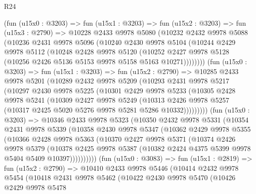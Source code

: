 \begin{lexlean}{R24}
\begin{coremodule}
    (fun (u15x0 : @3203) =>
    fun (u15x1 : @3203) =>
    fun (u15x2 : @3203) =>
    fun (u15x3 : @2790) =>
    @10228
      @2433
      @9978
      @5080
      (@10232
        @2432
        @9978
        @5088
        (@10236
          @2431
          @9978
          @5096
          (@10240
            @2430
            @9978
            @5104
            (@10244
              @2429
              @9978
              @5112
              (@10248
                @2428
                @9978
                @5120
                (@10252 @2427 @9978 @5128 (@10256 @2426 @5136 @5153 @9978 @5158 @5163 @10271))))))))
    (fun (u15x0 : @3203) =>
    fun (u15x1 : @3203) =>
    fun (u15x2 : @2790) =>
    @10285
      @2433
      @9978
      @5201
      (@10289
        @2432
        @9978
        @5209
        (@10293
          @2431
          @9978
          @5217
          (@10297
            @2430
            @9978
            @5225
            (@10301
              @2429
              @9978
              @5233
              (@10305
                @2428
                @9978
                @5241
                (@10309
                  @2427
                  @9978
                  @5249
                  (@10313
                    @2426
                    @9978
                    @5257
                    (@10317 @2425 @5020 @5276 @9978 @5281 @5286 @10332)))))))))
    (fun (u15x0 : @3203) =>
    @10346
      @2433
      @9978
      @5323
      (@10350
        @2432
        @9978
        @5331
        (@10354
          @2431
          @9978
          @5339
          (@10358
            @2430
            @9978
            @5347
            (@10362
              @2429
              @9978
              @5355
              (@10366
                @2428
                @9978
                @5363
                (@10370
                  @2427
                  @9978
                  @5371
                  (@10374
                    @2426
                    @9978
                    @5379
                    (@10378
                      @2425
                      @9978
                      @5387
                      (@10382 @2424 @4375 @5399 @9978 @5404 @5409 @10397))))))))))
    (fun (u15x0 : @3083) =>
    fun (u15x1 : @2819) =>
    fun (u15x2 : @2790) =>
    @10410
      @2433
      @9978
      @5446
      (@10414
        @2432
        @9978
        @5454
        (@10418
          @2431
          @9978
          @5462
          (@10422
            @2430
            @9978
            @5470
            (@10426
              @2429
              @9978
              @5478

\end{coremodule}
\end{lexlean}

